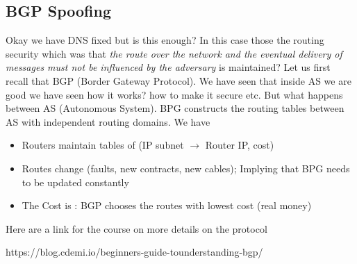 \subsection{BGP Spoofing}
Okay we have DNS fixed but is this enough? In this case those the routing security which was that \textit{the route over the network and the eventual delivery of messages must not be influenced by the adversary} is maintained? Let us first recall that BGP (Border Gateway Protocol). We have seen that inside AS we are good we have seen how it works? how to make it secure etc. But what happens between AS (Autonomous System). BPG constructs the routing tables between AS with independent routing domains. We have
\begin{itemize}
    \item Routers maintain tables of (IP subnet $\to$ Router IP, cost)
    \item Routes change (faults, new contracts, new cables); Implying that BPG needs to be updated constantly
    \item The Cost is : BGP chooses the routes with lowest cost (real money)
\end{itemize}
\begin{framedremark}
Here are a link for the course on more details on the protocol
\begin{center}
https://blog.cdemi.io/beginners-guide-tounderstanding-bgp/
\end{center}
\end{framedremark}
